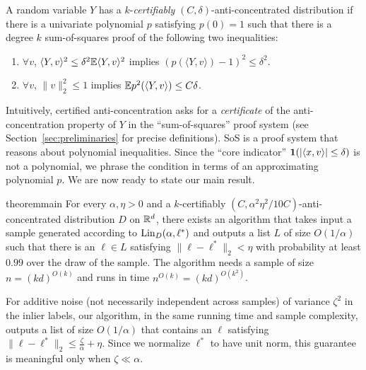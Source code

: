 \begin{definition} \label{def:certified-anti-concentration}
A random variable $Y$ has a $k$-\emph{certifiably} $(C,\delta)$-anti-concentrated distribution if there is a univariate polynomial $p$ satisfying $p(0) = 1$ such that there is a degree $k$ sum-of-squares proof of the following two inequalities: 
\begin{enumerate} 
\item $\forall v$, $\langle Y,v\rangle^2 \leq \delta^2 \mathbb{E} \langle Y,v\rangle^2$ implies $(p(\langle Y,v\rangle) -1)^2\leq \delta^2$.
\item $\forall v$, $\|v\|_2^2 \leq 1$ implies  $\mathbb{E} p^2(\left \langle Y,v\rangle \right) \leq C\delta$.
\end{enumerate}
\end{definition} 
Intuitively, certified anti-concentration asks for a \emph{certificate} of the anti-concentration property of $Y$ in the ``sum-of-squares'' proof system (see Section~\ref{sec:preliminaries} for precise definitions). SoS is a proof system that reasons about  polynomial inequalities. Since the ``core indicator'' $\bm{1}(|\langle x,v\rangle| \leq \delta)$ is not a polynomial, we phrase the condition in terms of an approximating polynomial $p$.
We are now ready to state our main result.
\begin{restatable}{theorem}{main} \label{thm:main}
For every $\alpha, \eta > 0$ and a $k$-certifiably $(C,\alpha^2 \eta^2/10C)$-anti-concentrated distribution $D$ on $\mathbb R^d$, there exists an algorithm that takes input a sample generated according to $\mathrm{Lin}_D(\alpha,\ell^*)$ and outputs a list $L$ of size $O(1/\alpha)$ such that there is an $\ell \in L$ satisfying $\| \ell - \ell^*\|_2 < \eta$ with probability at least $0.99$ over the draw of the sample. The algorithm needs a sample of size $n = (kd)^{O(k)}$ and runs in time $n^{O(k)} = (kd)^{O(k^2)}$.
\end{restatable} 
\begin{remark}\label{remark:tolerating-additive-noise-intro}
For additive noise (not necessarily independent across samples) of variance $\zeta^2$ in the inlier labels, our algorithm, in the same running time and sample complexity, outputs a list of size $O(1/\alpha)$ that contains an $\ell$ satisfying $\|\ell-\ell^*\|_2 \leq \frac{\zeta}{\alpha} + \eta$. Since we normalize $\ell^*$ to have unit norm, this guarantee is meaningful only when $\zeta \ll \alpha$. %
\end{remark}

